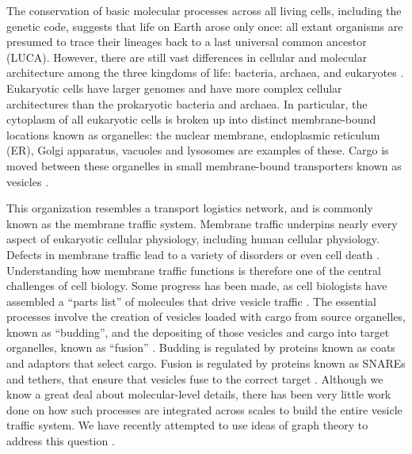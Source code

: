 

The conservation of basic molecular processes across all living cells, including the genetic code, suggests that life on Earth arose only once: all extant organisms are presumed to trace their lineages back to a last universal common ancestor (LUCA). However, there are still vast differences in cellular and molecular architecture among the three kingdoms of life: bacteria, archaea, and eukaryotes \cite{embley2006eukaryotic}. Eukaryotic cells have larger genomes and have more complex cellular architectures than the prokaryotic bacteria and archaea. In particular, the cytoplasm of all eukaryotic cells is broken up into distinct membrane-bound locations known as organelles: the nuclear membrane, endoplasmic reticulum (ER), Golgi apparatus, vacuoles and lysosomes are examples of these. Cargo is moved between these organelles in small membrane-bound transporters known as vesicles \cite{stenmark2009rab}.

This organization resembles a transport logistics network, and is commonly known as the membrane traffic system. Membrane traffic underpins nearly every aspect of eukaryotic cellular physiology, including human cellular physiology. Defects in membrane traffic lead to a variety of disorders or even cell death \cite{stenmark2009rab}. Understanding how membrane traffic functions is therefore one of the central challenges of cell biology. Some progress has been made, as cell biologists have assembled a “parts list” of molecules that drive vesicle traffic \cite{dacks2007evolution}. The essential processes involve the creation of vesicles loaded with cargo from source organelles, known as “budding”, and the depositing of those vesicles and cargo into target organelles, known as “fusion” \cite{munro2004organelle}. Budding is regulated by proteins known as coats and adaptors that select cargo. Fusion is regulated by proteins known as SNAREs and tethers, that ensure that vesicles fuse to the correct target \cite{mani2016stacking}. Although we know a great deal about molecular-level details, there has been very little work done on how such processes are integrated across scales to build the entire vesicle traffic system. We have recently attempted to use ideas of graph theory to address this question \cite{mani2016stacking,shukla}.

